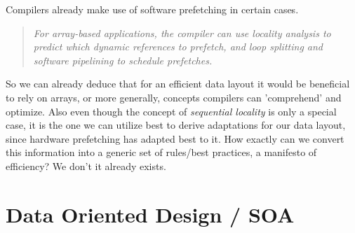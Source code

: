 Compilers already make use of software prefetching in certain cases.
\begin{quote}
	\textit{For array-based applications, the compiler can use locality analysis to predict which dynamic references to prefetch, and loop splitting and software pipelining to schedule prefetches.} 
\end{quote}
So we can already deduce that for an efficient data layout it would be beneficial to rely on arrays, or more generally, concepts compilers can 'comprehend' and optimize. Also even though the concept of \textit{sequential locality} is only a special case, it is the one we can utilize best to derive adaptations for our data layout, since hardware prefetching has adapted best to it. How exactly can we convert this information into a generic set of rules/best practices, a manifesto of efficiency? We don't it already exists.

\section{Data Oriented Design / SOA}\label{dod}
